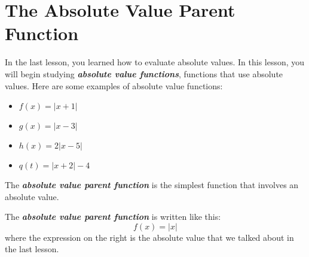 

\section*{The Absolute Value Parent Function}

In the last lesson, you learned how to evaluate absolute values.
In this lesson, you will begin studying 
{\bfseries\itshape absolute value functions},
functions that use absolute values.
Here are some examples of absolute value functions:
\begin{itemize}
    \item $f(x) = |x +1|$
    \item $g(x) = |x - 3|$
    \item $h(x) = 2|x-5|$
    \item $q(t) = |x+2| - 4$
\end{itemize}
%
The {\bfseries\itshape absolute value parent function} 
is the simplest function that involves an absolute value.

\begin{center}
    \begin{tcolorbox}
        The {\bfseries\itshape absolute value parent function} is written like this:
        \[
            f(x) = |x|
        \]
        where the expression on the right is the absolute value that we talked about 
        in the last lesson.
    \end{tcolorbox}
\end{center}



